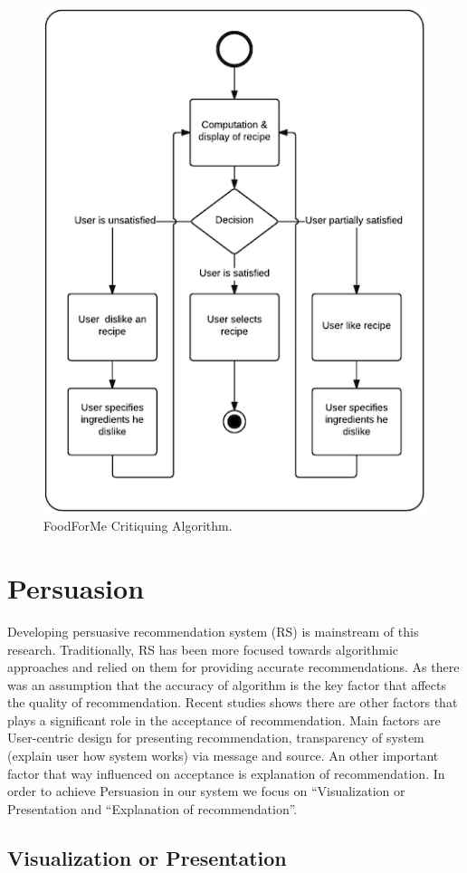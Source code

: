 	  \begin{figure}[h]
	  	\centering
	  	\includegraphics[width=.6\linewidth]{figures/ch3_critique_algo.png}
	  	\caption{FoodForMe Critiquing Algorithm.}
	  	\label{fig:ch3_critique_algo}
	  \end{figure}
	  
\newpage	  
\section{Persuasion}

Developing persuasive recommendation system (RS) is mainstream of this research. Traditionally, RS has been more focused towards algorithmic approaches and relied on them for providing accurate recommendations. As there was an assumption that the accuracy of algorithm is the key factor that affects the quality of recommendation. Recent studies shows there are other factors that plays a significant role in the acceptance of recommendation. Main factors are User-centric design for presenting recommendation, transparency of system (explain user how system works) via message and source. An other important factor that way influenced on acceptance is explanation of recommendation\cite{gkika2014persuasive}. In order to achieve Persuasion in our system we focus on   “Visualization or Presentation \cite{nanou2010effects} \cite{pu2006trust} and “Explanation of recommendation\cite{cialdini2009influence}\cite{fogg1998persuasive}”.
  
\subsection{Visualization or Presentation}

